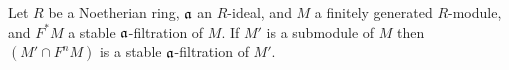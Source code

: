 \begin{thm}\label{thm:artin_rees_lemma}
Let $R$ be a Noetherian ring, $\mathfrak{a}$ an $R$-ideal, and $M$ a
finitely generated $R$-module, and $F^*M$ a stable 
$\mathfrak{a}$-filtration of $M$. If $M'$ is a submodule of $M$ then
$(M' \cap F^nM)$ is a stable $\mathfrak{a}$-filtration of $M'$.
\end{thm}
